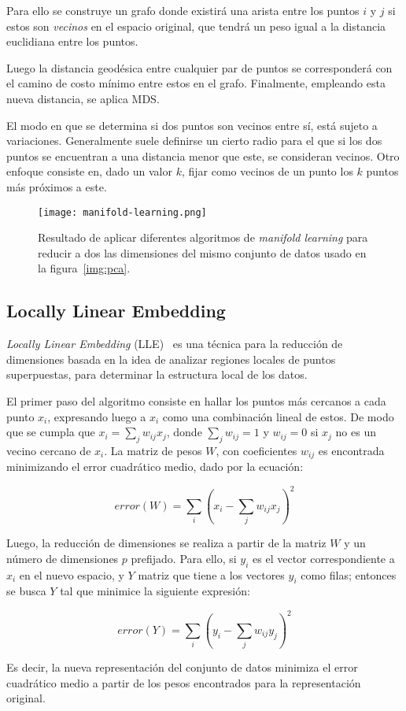 Para ello se construye un grafo donde existirá una arista entre los puntos $i$ y $j$ si estos son \textit{vecinos} en el espacio original, que tendrá un peso igual a la distancia euclidiana entre los puntos.

Luego la distancia geodésica entre cualquier par de puntos se corresponderá con el camino de costo mínimo entre estos en el grafo.
Finalmente, empleando esta nueva distancia, se aplica MDS\@.

El modo en que se determina si dos puntos son vecinos entre sí, está sujeto a variaciones.
Generalmente suele definirse un cierto radio para el que si los dos puntos se encuentran a una distancia menor que este, se consideran vecinos.
Otro enfoque consiste en, dado un valor $k$, fijar como vecinos de un punto los $k$ puntos más próximos a este.

\begin{figure}[!h]
    \centering
    \texttt{[image: manifold-learning.png]}
    \caption{Resultado de aplicar diferentes algoritmos de \textit{manifold learning} para reducir a dos las dimensiones del mismo conjunto de datos usado en la figura~\ref{img:pca}.}
    \label{img:manifold-learning}
\end{figure}

\subsection{Locally Linear Embedding}\label{subsec:LLE}

\textit{Locally Linear Embedding} (LLE)~\cite{Roweis00} es una técnica para la reducción de dimensiones basada en la idea de analizar regiones locales de puntos superpuestas, para determinar la estructura local de los datos.

El primer paso del algoritmo consiste en hallar los puntos más cercanos a cada punto $x_i$, expresando luego a $x_i$ como una combinación lineal de estos.
De modo que se cumpla que $x_i =\sum_j {w_{ij}x_j}$, donde $\sum_j w_{ij}=1$ y $w_{ij} = 0$ si $x_j$ no es un vecino cercano de $x_i$.
La matriz de pesos $W$, con coeficientes $w_{ij}$ es encontrada minimizando el error cuadrático medio, dado por la ecuación:

\begin{equation}
    error(W) = \sum_i \left( x_i - \sum_j {w_{ij}x_j} \right)^2
\end{equation}

Luego, la reducción de dimensiones se realiza a partir de la matriz $W$ y un número de dimensiones $p$ prefijado.
Para ello, si $y_i$ es el vector correspondiente a $x_i$ en el nuevo espacio, y $Y$ matriz que tiene a los vectores $y_i$ como filas;
entonces se busca $Y$ tal que minimice la siguiente expresión:

\begin{equation}
    error(Y) = \sum_i \left( y_i - \sum_j {w_{ij}y_j} \right)^2
\end{equation}

Es decir, la nueva representación del conjunto de datos minimiza el error cuadrático medio a partir de los pesos encontrados para la representación original.
